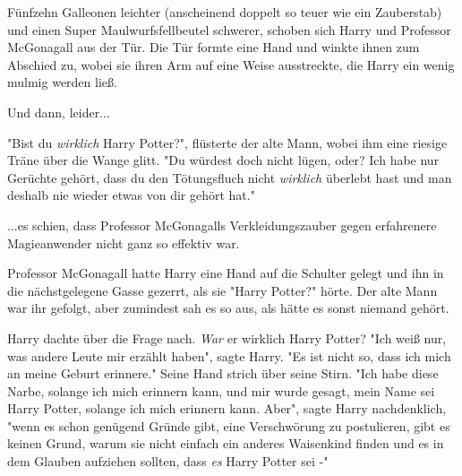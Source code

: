Fünfzehn Galleonen leichter (anscheinend doppelt so teuer wie ein Zauberstab) und einen Super Maulwurfsfellbeutel  schwerer, schoben sich Harry und Professor McGonagall aus der Tür. Die Tür formte eine Hand und winkte ihnen zum Abschied zu, wobei sie ihren Arm auf eine Weise ausstreckte, die Harry ein wenig mulmig werden ließ.

Und dann, leider... 

"Bist du \emph{wirklich} Harry Potter?", flüsterte der alte Mann, wobei ihm eine riesige Träne über die Wange glitt. "Du würdest doch nicht lügen, oder? Ich habe nur Gerüchte gehört, dass du den Tötungsfluch nicht \emph{wirklich} überlebt hast und man deshalb nie wieder etwas von dir gehört hat." 

...es schien, dass Professor McGonagalls Verkleidungszauber gegen erfahrenere Magieanwender nicht ganz so effektiv war.

Professor McGonagall hatte Harry eine Hand auf die Schulter gelegt und ihn in die nächstgelegene Gasse gezerrt, als sie "Harry Potter?" hörte. Der alte Mann war ihr gefolgt, aber zumindest sah es so aus, als hätte es sonst niemand gehört. 

Harry dachte über die Frage nach. \emph{War} er wirklich Harry Potter? "Ich weiß nur, was andere Leute mir erzählt haben", sagte Harry. "Es ist nicht so, dass ich mich an meine Geburt erinnere." Seine Hand strich über seine Stirn. "Ich habe diese Narbe, solange ich mich erinnern kann, und mir wurde gesagt, mein Name sei Harry Potter, solange ich mich erinnern kann. Aber", sagte Harry nachdenklich, "wenn es schon genügend Gründe gibt, eine Verschwörung zu postulieren, gibt es keinen Grund, warum sie nicht einfach ein anderes Waisenkind finden und es in dem Glauben aufziehen sollten, dass \emph{es} Harry Potter sei -" 

